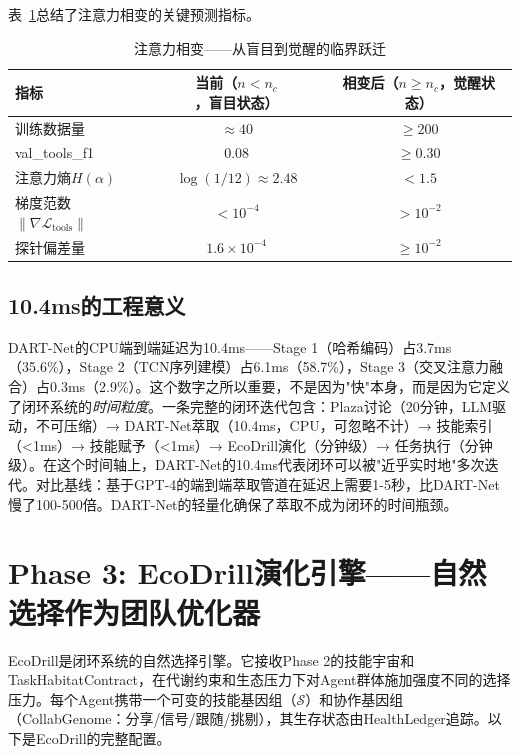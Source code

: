 \documentclass[12pt,a4paper]{ctexart}
\def\cL{\mathcal{L}}
\def\cS{\mathcal{S}}
\begin{document}
表~\ref{tab:phase_transition}总结了注意力相变的关键预测指标。

\begin{table}[H]
\centering
\caption{注意力相变——从盲目到觉醒的临界跃迁}
\label{tab:phase_transition}
\renewcommand{\arraystretch}{1.2}
\begin{tabular}{lcc}
\toprule
指标 & 当前（$n < n_c$，盲目状态） & 相变后（$n \geq n_c$，觉醒状态） \\
\midrule
训练数据量 & $\approx 40$ & $\geq 200$ \\
val\_tools\_f1 & 0.08 & $\geq 0.30$ \\
注意力熵$H(\alpha)$ & $\log(1/12) \approx 2.48$ & $< 1.5$ \\
梯度范数$\|\nabla \cL_{\text{tools}}\|$ & $< 10^{-4}$ & $> 10^{-2}$ \\
探针偏差量 & $1.6\times 10^{-4}$ & $\geq 10^{-2}$ \\
\bottomrule
\end{tabular}
\end{table}

\subsection{10.4ms的工程意义}

DART-Net的CPU端到端延迟为10.4ms——Stage 1（哈希编码）占3.7ms（35.6\%），Stage 2（TCN序列建模）占6.1ms（58.7\%），Stage 3（交叉注意力融合）占0.3ms（2.9\%）。这个数字之所以重要，不是因为"快"本身，而是因为它定义了闭环系统的\emph{时间粒度}。一条完整的闭环迭代包含：Plaza讨论（20分钟，LLM驱动，不可压缩）→ DART-Net萃取（10.4ms，CPU，可忽略不计）→ 技能索引（<1ms）→ 技能赋予（<1ms）→ EcoDrill演化（分钟级）→ 任务执行（分钟级）。在这个时间轴上，DART-Net的10.4ms代表闭环可以被"近乎实时地"多次迭代。对比基线：基于GPT-4的端到端萃取管道在延迟上需要1-5秒，比DART-Net慢了100-500倍。DART-Net的轻量化确保了萃取不成为闭环的时间瓶颈。

\section{Phase 3: EcoDrill演化引擎——自然选择作为团队优化器}

EcoDrill是闭环系统的自然选择引擎。它接收Phase 2的技能宇宙和TaskHabitatContract，在代谢约束和生态压力下对Agent群体施加强度不同的选择压力。每个Agent携带一个可变的技能基因组（$\cS$）和协作基因组（CollabGenome：分享/信号/跟随/挑剔），其生存状态由HealthLedger追踪。以下是EcoDrill的完整配置。
\end{document}
